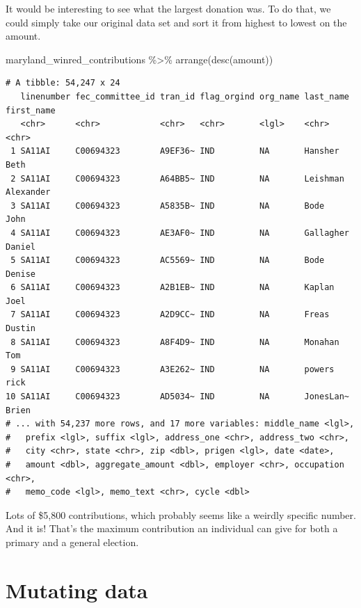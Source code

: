 \documentclass[
  letterpaper,
  DIV=11,
  numbers=noendperiod]{scrreprt}
\newenvironment{Shaded}{\begin{snugshade}}{\end{snugshade}}
\newcommand{\FunctionTok}[1]{\textcolor[rgb]{0.28,0.35,0.67}{#1}}
\newcommand{\NormalTok}[1]{\textcolor[rgb]{0.00,0.23,0.31}{#1}}
\newcommand{\SpecialCharTok}[1]{\textcolor[rgb]{0.37,0.37,0.37}{#1}}
\begin{document}
It would be interesting to see what the largest donation was. To do
that, we could simply take our original data set and sort it from
highest to lowest on the amount.

\begin{Shaded}
\begin{Highlighting}[]
\NormalTok{maryland\_winred\_contributions }\SpecialCharTok{\%\textgreater{}\%}
  \FunctionTok{arrange}\NormalTok{(}\FunctionTok{desc}\NormalTok{(amount))}
\end{Highlighting}
\end{Shaded}

\begin{verbatim}
# A tibble: 54,247 x 24
   linenumber fec_committee_id tran_id flag_orgind org_name last_name first_name
   <chr>      <chr>            <chr>   <chr>       <lgl>    <chr>     <chr>     
 1 SA11AI     C00694323        A9EF36~ IND         NA       Hansher   Beth      
 2 SA11AI     C00694323        A64BB5~ IND         NA       Leishman  Alexander 
 3 SA11AI     C00694323        A5835B~ IND         NA       Bode      John      
 4 SA11AI     C00694323        AE3AF0~ IND         NA       Gallagher Daniel    
 5 SA11AI     C00694323        AC5569~ IND         NA       Bode      Denise    
 6 SA11AI     C00694323        A2B1EB~ IND         NA       Kaplan    Joel      
 7 SA11AI     C00694323        A2D9CC~ IND         NA       Freas     Dustin    
 8 SA11AI     C00694323        A8F4D9~ IND         NA       Monahan   Tom       
 9 SA11AI     C00694323        A3E262~ IND         NA       powers    rick      
10 SA11AI     C00694323        AD5034~ IND         NA       JonesLan~ Brien     
# ... with 54,237 more rows, and 17 more variables: middle_name <lgl>,
#   prefix <lgl>, suffix <lgl>, address_one <chr>, address_two <chr>,
#   city <chr>, state <chr>, zip <dbl>, prigen <lgl>, date <date>,
#   amount <dbl>, aggregate_amount <dbl>, employer <chr>, occupation <chr>,
#   memo_code <lgl>, memo_text <chr>, cycle <dbl>
\end{verbatim}

Lots of \$5,800 contributions, which probably seems like a weirdly
specific number. And it is! That's the maximum contribution an
individual can give for both a primary and a general election.


\hypertarget{mutating-data}{%
\chapter{Mutating data}\label{mutating-data}}
\end{document}
